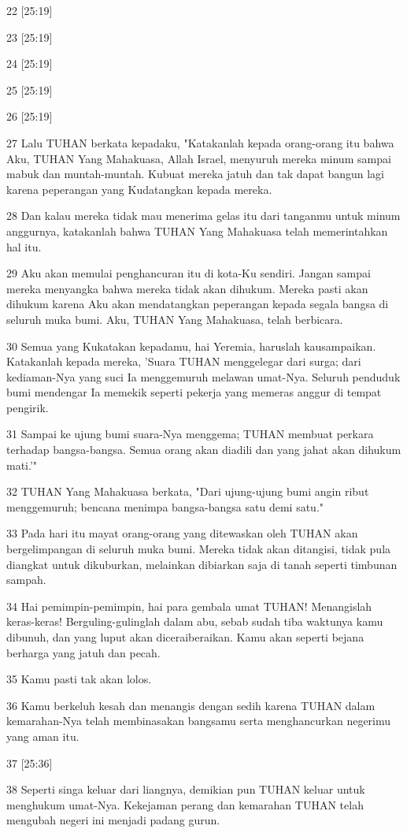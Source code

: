 \par 22 [25:19]
\par 23 [25:19]
\par 24 [25:19]
\par 25 [25:19]
\par 26 [25:19]
\par 27 Lalu TUHAN berkata kepadaku, "Katakanlah kepada orang-orang itu bahwa Aku, TUHAN Yang Mahakuasa, Allah Israel, menyuruh mereka minum sampai mabuk dan muntah-muntah. Kubuat mereka jatuh dan tak dapat bangun lagi karena peperangan yang Kudatangkan kepada mereka.
\par 28 Dan kalau mereka tidak mau menerima gelas itu dari tanganmu untuk minum anggurnya, katakanlah bahwa TUHAN Yang Mahakuasa telah memerintahkan hal itu.
\par 29 Aku akan memulai penghancuran itu di kota-Ku sendiri. Jangan sampai mereka menyangka bahwa mereka tidak akan dihukum. Mereka pasti akan dihukum karena Aku akan mendatangkan peperangan kepada segala bangsa di seluruh muka bumi. Aku, TUHAN Yang Mahakuasa, telah berbicara.
\par 30 Semua yang Kukatakan kepadamu, hai Yeremia, haruslah kausampaikan. Katakanlah kepada mereka, 'Suara TUHAN menggelegar dari surga; dari kediaman-Nya yang suci Ia menggemuruh melawan umat-Nya. Seluruh penduduk bumi mendengar Ia memekik seperti pekerja yang memeras anggur di tempat pengirik.
\par 31 Sampai ke ujung bumi suara-Nya menggema; TUHAN membuat perkara terhadap bangsa-bangsa. Semua orang akan diadili dan yang jahat akan dihukum mati.'"
\par 32 TUHAN Yang Mahakuasa berkata, "Dari ujung-ujung bumi angin ribut menggemuruh; bencana menimpa bangsa-bangsa satu demi satu."
\par 33 Pada hari itu mayat orang-orang yang ditewaskan oleh TUHAN akan bergelimpangan di seluruh muka bumi. Mereka tidak akan ditangisi, tidak pula diangkat untuk dikuburkan, melainkan dibiarkan saja di tanah seperti timbunan sampah.
\par 34 Hai pemimpin-pemimpin, hai para gembala umat TUHAN! Menangislah keras-keras! Berguling-gulinglah dalam abu, sebab sudah tiba waktunya kamu dibunuh, dan yang luput akan diceraiberaikan. Kamu akan seperti bejana berharga yang jatuh dan pecah.
\par 35 Kamu pasti tak akan lolos.
\par 36 Kamu berkeluh kesah dan menangis dengan sedih karena TUHAN dalam kemarahan-Nya telah membinasakan bangsamu serta menghancurkan negerimu yang aman itu.
\par 37 [25:36]
\par 38 Seperti singa keluar dari liangnya, demikian pun TUHAN keluar untuk menghukum umat-Nya. Kekejaman perang dan kemarahan TUHAN telah mengubah negeri ini menjadi padang gurun.

